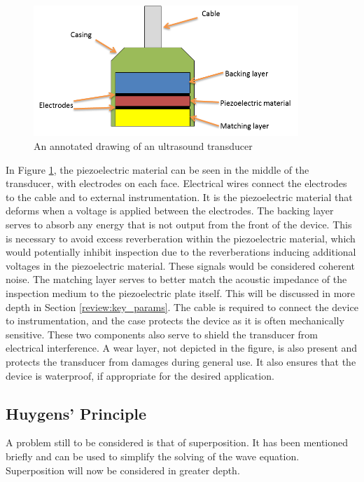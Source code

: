\begin{figure}[htp]
\centering
		\includegraphics[width=100mm]{TransducerDiagramContrast.png}
		\caption{An annotated drawing of an ultrasound transducer}
		\label{fig:review_transducer}
\end{figure}

In Figure \ref{fig:review_transducer}, the piezoelectric material can be seen in the middle of the transducer, with electrodes on each face. Electrical wires connect the electrodes to the cable and to external instrumentation. It is the piezoelectric material that deforms when a voltage is applied between the electrodes\cite{fukumoto_design_1981}. The backing layer serves to absorb any energy that is not output from the front of the device. This is necessary to avoid excess reverberation within the piezoelectric material, which would potentially inhibit inspection due to the reverberations inducing additional voltages in the piezoelectric material. These signals would be considered coherent noise. The matching layer serves to better match the acoustic impedance of the inspection medium to the piezoelectric plate itself. This will be discussed in more depth in Section \ref{review:key_params}. The cable is required to connect the device to instrumentation, and the case protects the device as it is often mechanically sensitive. These two components also serve to shield the transducer from electrical interference. A wear layer, not depicted in the figure, is also present and protects the transducer from damages during general use. It also ensures that the device is waterproof, if appropriate for the desired application.

\subsection{Huygens' Principle}\label{sec:huygens}

A problem still to be considered is that of superposition. It has been mentioned briefly and can be used to simplify the solving of the wave equation. Superposition will now be considered in greater depth.

